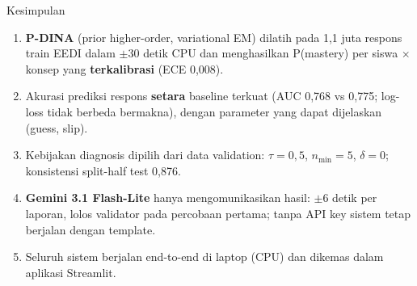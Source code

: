 \documentclass[aspectratio=169,10pt]{beamer}
\begin{document}
\begin{frame}{Kesimpulan}
  \begin{enumerate}
    \item \textbf{P-DINA} (prior higher-order, variational EM) dilatih pada 1,1 juta respons train EEDI dalam
          $\pm$30 detik CPU dan menghasilkan P(mastery) per siswa $\times$ konsep yang \textbf{terkalibrasi} (ECE 0,008).
    \item Akurasi prediksi respons \textbf{setara} baseline terkuat (AUC 0,768 vs 0,775; log-loss tidak berbeda
          bermakna), dengan parameter yang dapat dijelaskan (guess, slip).
    \item Kebijakan diagnosis dipilih dari data validation: $\tau=0{,}5$, $n_{\min}=5$, $\delta=0$; konsistensi
          split-half test 0,876.
    \item \textbf{Gemini 3.1 Flash-Lite} hanya mengomunikasikan hasil: $\pm$6 detik per laporan, lolos validator pada
          percobaan pertama; tanpa API key sistem tetap berjalan dengan template.
    \item Seluruh sistem berjalan end-to-end di laptop (CPU) dan dikemas dalam aplikasi Streamlit.
  \end{enumerate}
\end{frame}
\end{document}
